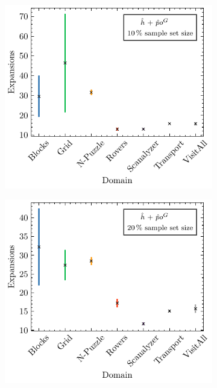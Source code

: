 \documentclass[ppgc,diss,english]{iiufrgs}
\begin{document}
\begin{figure}[tb]
  \vspace{0.5cm}

  \begin{subfigure}{0.41\textwidth}
    \centering
    \includegraphics[width=\linewidth]{img/error_hNN_poG_10pct.pdf}
  \end{subfigure}
  \begin{subfigure}{0.41\textwidth}
    \centering
    \includegraphics[width=\linewidth]{img/error_hNN_poG_20pct.pdf}
  \end{subfigure}


\end{figure}
\end{document}
